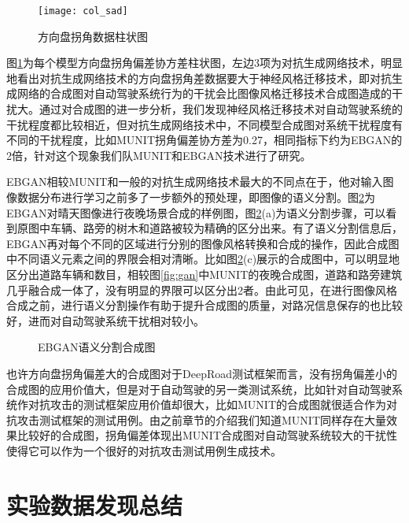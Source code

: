 \begin{figure}[ht]
    \centering
    \texttt{[image: col\_sad]}
    \caption{方向盘拐角数据柱状图}
    \label{fig:col_sad}
\end{figure}

图\ref{fig:col_sad}为每个模型方向盘拐角偏差协方差柱状图，左边3项为对抗生成网络技术，明显地看出对抗生成网络技术的方向盘拐角差数据要大于神经风格迁移技术，即对抗生成网络的合成图对自动驾驶系统行为的干扰会比图像风格迁移技术合成图造成的干扰大。通过对合成图的进一步分析，我们发现神经风格迁移技术对自动驾驶系统的干扰程度都比较相近，但对抗生成网络技术中，不同模型合成图对系统干扰程度有不同的干扰程度，比如MUNIT拐角偏差协方差为0.27，相同指标下约为EBGAN的2倍，针对这个现象我们队MUNIT和EBGAN技术进行了研究。

EBGAN相较MUNIT和一般的对抗生成网络技术最大的不同点在于，他对输入图像数据分布进行学习之前多了一步额外的预处理，即图像的语义分割。图\ref{fig:seg}为EBGAN对晴天图像进行夜晚场景合成的样例图，图\ref{fig:seg}(a)为语义分割步骤，可以看到原图中车辆、路旁的树木和道路被较为精确的区分出来。有了语义分割信息后，EBGAN再对每个不同的区域进行分别的图像风格转换和合成的操作，因此合成图中不同语义元素之间的界限会相对清晰。比如图\ref{fig:seg}(c)展示的合成图中，可以明显地区分出道路车辆和数目，相较图\ref{fig:gan}中MUNIT的夜晚合成图，道路和路旁建筑几乎融合成一体了，没有明显的界限可以区分出2者。由此可见，在进行图像风格合成之前，进行语义分割操作有助于提升合成图的质量，对路况信息保存的也比较好，进而对自动驾驶系统干扰相对较小。

\begin{figure}[h]
    \centering
    \caption{EBGAN语义分割合成图}
    \label{fig:seg}
\end{figure}


也许方向盘拐角偏差大的合成图对于DeepRoad测试框架而言，没有拐角偏差小的合成图的应用价值大，但是对于自动驾驶的另一类测试系统，比如针对自动驾驶系统作对抗攻击的测试框架应用价值却很大，比如MUNIT的合成图就很适合作为对抗攻击测试框架的测试用例。由之前章节的介绍我们知道MUNIT同样存在大量效果比较好的合成图，拐角偏差体现出MUNIT合成图对自动驾驶系统较大的干扰性使得它可以作为一个很好的对抗攻击测试用例生成技术。　


\section{实验数据发现总结}

